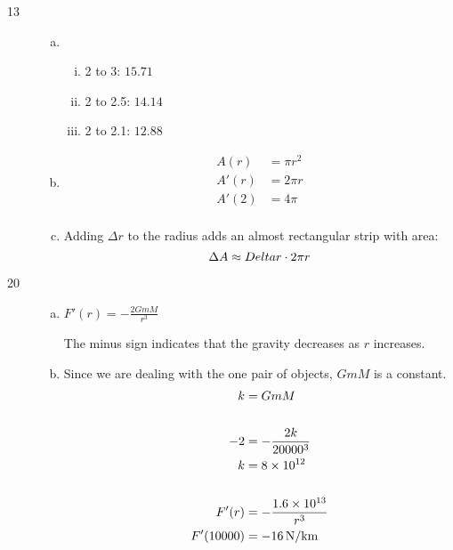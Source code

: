 \documentclass[letterpaper, landscape]{exam}
\begin{document}
\begin{description}
\begin{enumerate}[(a)]
\begin{solution}
          \end{solution}

      \end{enumerate}

    \item[13]
      \begin{enumerate}[(a)]
        \item 
          \begin{enumerate}[(i)]
            \item 2 to 3: $15.71$
            \item 2 to 2.5: $14.14$
            \item 2 to 2.1: $12.88$
          \end{enumerate}
        \item 
          \begin{align*}
            A(r)  & = \pi r^2 \\
            A'(r) & = 2 \pi r \\
            A'(2) & = 4 \pi \\
          \end{align*}

        \item Adding $\Delta r$ to the radius adds an almost rectangular strip with area:
          \[
            \Delta A \approx Delta r \cdot 2 \pi r \\
          \]
      \end{enumerate}

    \item[20]
      \begin{enumerate}[(a)]
        \item $F'(r) = -\frac{2 G m M}{r^3}$

          The minus sign indicates that the gravity decreases as $r$ increases.

        \item Since we are dealing with the one pair of objects, $GmM$ is a constant.
          \begin{align*}
            k         & = G m M \\
            \\
            -2        & = - \frac{2 k}{20000^3} \\
            k         & = 8 \times 10^{12} \\
            \\
            F'(r)     & = - \frac{1.6 \times 10^{13}}{r^3} \\
            F'(10000) & = \unit[-16]{N/km} \\
          \end{align*}

      \end{enumerate}

  \end{description}
\end{document}
